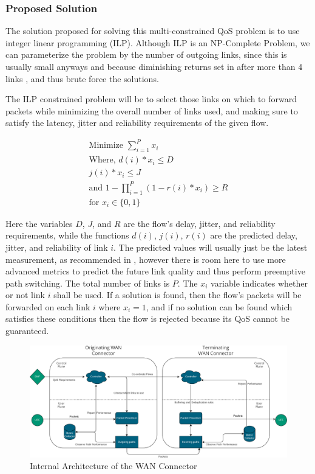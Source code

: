 \subsubsection{Proposed Solution}

The solution proposed for solving this multi-constrained QoS problem is to use integer linear programming (ILP). Although ILP is an NP-Complete Problem, we can parameterize the problem by the number of outgoing links, since this is usually small anyways and because diminishing returns set in after more than 4 links \cite{akella2003measurement}, and thus brute force the solutions.

The ILP constrained problem will be to select those links on which to forward packets while minimizing the overall number of links used, and making sure to satisfy the latency, jitter and reliability requirements of the given flow.

\begin{gather}
\text{Minimize } \sum_{i=1}^{P}x_i \\
\text{Where, } d(i) * x_i\le D \\
j(i) * x_i \le J \\
\text{and }1 - \prod_{i=1}^{P}{ ( 1- r(i) * x_i ) } \ge R  \\
\text{for } x_i \in \{0,1\}
\end{gather}

Here the variables $D$, $J$, and $R$ are the flow's delay, jitter, and reliability requirements, while the functions $d(i)$, $j(i)$, $r(i)$ are the predicted delay, jitter, and reliability of link $i$. The predicted values will usually just be the latest measurement, as recommended in \cite{akella2008performance}, however there is room here to use more advanced metrics to predict the future link quality and thus perform preemptive path switching. The total number of links is $P$. The $x_i$ variable indicates whether or not link $i$ shall be used. If a solution is found, then the flow's packets will be forwarded on each link $i$ where $x_i = 1$, and if no solution can be found which satisfies these conditions then the flow is rejected because its QoS cannot be guaranteed.

\begin{figure}[h]
    \centering
        \includegraphics[width=\textwidth]{fig/be-architecture.png}
        \caption{Internal Architecture of the WAN Connector}
        \label{fig:arch}
\end{figure}

